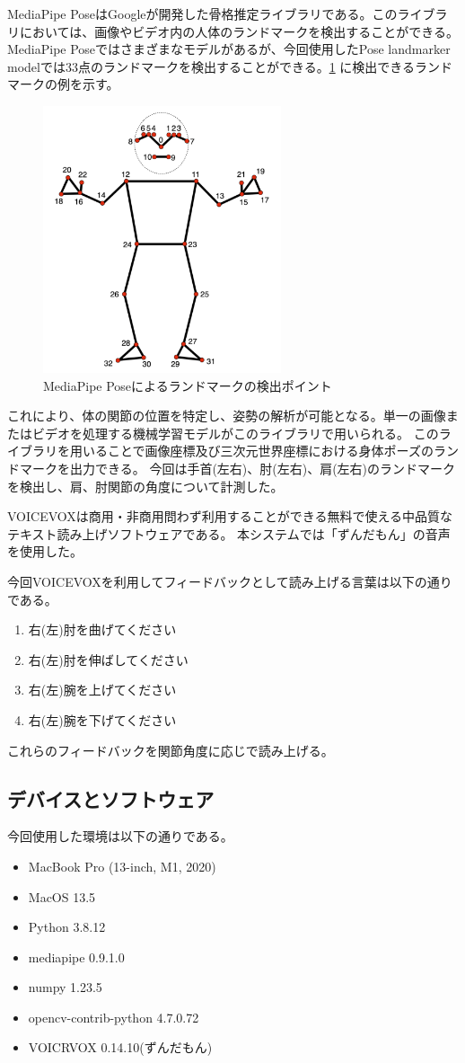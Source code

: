 MediaPipe Pose\cite{mediapipe_pose_landmarker}はGoogleが開発した骨格推定ライブラリである。このライブラリにおいては、画像やビデオ内の人体のランドマークを検出することができる。
MediaPipe Poseではさまざまなモデルがあるが、今回使用したPose landmarker modelでは33点のランドマークを検出することができる。\ref{fig:mediapipe} に検出できるランドマークの例を示す。
\begin{figure}[H]
  \begin{center}
    \includegraphics[width=7cm]{figures/mediapipe.png}
    \caption{MediaPipe Poseによるランドマークの検出ポイント}
    \label{fig:mediapipe}
  \end{center}
\end{figure}  
これにより、体の関節の位置を特定し、姿勢の解析が可能となる。単一の画像またはビデオを処理する機械学習モデルがこのライブラリで用いられる。
このライブラリを用いることで画像座標及び三次元世界座標における身体ポーズのランドマークを出力できる。
今回は手首(左右)、肘(左右)、肩(左右)のランドマークを検出し、肩、肘関節の角度について計測した。

VOICEVOXは商用・非商用問わず利用することができる無料で使える中品質なテキスト読み上げソフトウェアである。
本システムでは「ずんだもん」の音声を使用した。


今回VOICEVOXを利用してフィードバックとして読み上げる言葉は以下の通りである。
\begin{enumerate}
  \item 右(左)肘を曲げてください
  \item 右(左)肘を伸ばしてください
  \item 右(左)腕を上げてください
  \item 右(左)腕を下げてください
\end{enumerate}
これらのフィードバックを関節角度に応じで読み上げる。

\subsection{デバイスとソフトウェア}
今回使用した環境は以下の通りである。
\begin{itemize}
  \item MacBook Pro (13-inch, M1, 2020)
  \item MacOS 13.5
  \item Python 3.8.12
  \item mediapipe 0.9.1.0
  \item numpy 1.23.5
  \item opencv-contrib-python 4.7.0.72
  \item VOICRVOX 0.14.10(ずんだもん)
\end{itemize}

